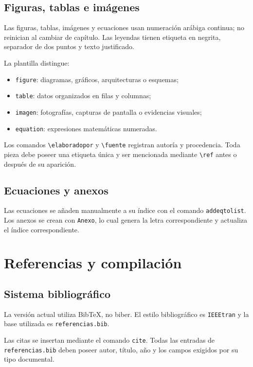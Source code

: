 \documentclass[12pt,a4paper,oneside]{report}
\begin{document}
\section{Figuras, tablas e imágenes}

Las figuras, tablas, imágenes y ecuaciones usan numeración arábiga continua; no reinician al cambiar de capítulo. Las leyendas tienen etiqueta en negrita, separador de dos puntos y texto justificado.

La plantilla distingue:

\begin{itemize}
  \item \texttt{figure}: diagramas, gráficos, arquitecturas o esquemas;
  \item \texttt{table}: datos organizados en filas y columnas;
  \item \texttt{imagen}: fotografías, capturas de pantalla o evidencias visuales;
  \item \texttt{equation}: expresiones matemáticas numeradas.
\end{itemize}

Los comandos \texttt{\textbackslash elaboradopor} y \texttt{\textbackslash fuente} registran autoría y procedencia. Toda pieza debe poseer una etiqueta única y ser mencionada mediante \texttt{\textbackslash ref} antes o después de su aparición.

\section{Ecuaciones y anexos}

Las ecuaciones se añaden manualmente a su índice con el comando \texttt{addeqtolist}. Los anexos se crean con \texttt{Anexo}, lo cual genera la letra correspondiente y actualiza el índice correspondiente.

\chapter{Referencias y compilación}

\section{Sistema bibliográfico}

La versión actual utiliza BibTeX, no biber. El estilo bibliográfico es \texttt{IEEEtran} y la base utilizada es \texttt{referencias.bib}.

Las citas se insertan mediante el comando \texttt{cite}. Todas las entradas de \texttt{referencias.bib} deben poseer autor, título, año y los campos exigidos por su tipo documental.
\end{document}
